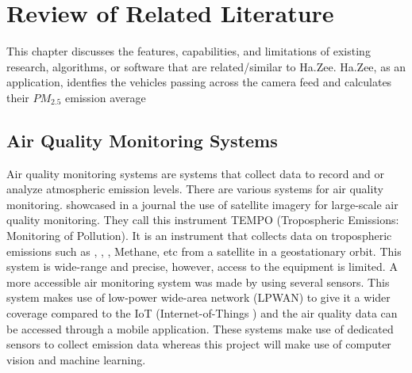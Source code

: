 \chapter{Review of Related Literature}
\label{sec:relatedlit}

This chapter discusses the features, capabilities, and limitations of existing research, algorithms, or software  that are related/similar to Ha.Zee. Ha.Zee, as an application, identfies the vehicles passing across the camera feed and calculates their $PM_{2.5}$ emission average


\begin{comment}
%
%
Guide on Writing your RRL chapter
 
1. Identify the keywords with respect to your research
      One keyword = One document section
                Examples: 2.1 Story Generation Systems
			 2.2 Knowledge Representation

2.  Find references using these keywords

3.  For each of the references that you find,
        Check: Is it relevant to your research?
        Use their references to find more relevant works.

4. Identify a set of criteria for comparison.
       It will serve as a guide to help you focus on what to look for

5. Write a summary focusing on -
       What: A short description of the work
       How: A summary of the approach it utilized
       Findings: If applicable, provide the results
        Why: Relevance to your work

6. At the end of each section,  show a Table of Comparison of the related works 
   and your proposed project/system

\end{comment}

\section{Air Quality Monitoring Systems}
Air quality monitoring systems are systems that collect data to record and or analyze atmospheric emission levels. There are various systems for air quality monitoring. \cite{zoogman_2017} showcased in a journal the use of satellite imagery for large-scale air quality monitoring. They call this instrument TEMPO (Tropospheric Emissions: Monitoring of Pollution). It is an instrument that collects data on tropospheric emissions such as , , , Methane, etc from a satellite in a geostationary orbit. This system is wide-range and precise,  however, access to the equipment is limited.  A more accessible air monitoring system was made by \cite{zheng_2016} using several sensors. This system makes use of low-power wide-area network (LPWAN) to give it a wider coverage compared to the IoT (Internet-of-Things ) and the air quality data can be accessed through a mobile application. These systems make use of dedicated sensors to collect emission data whereas this project will make use of computer vision and machine learning.


